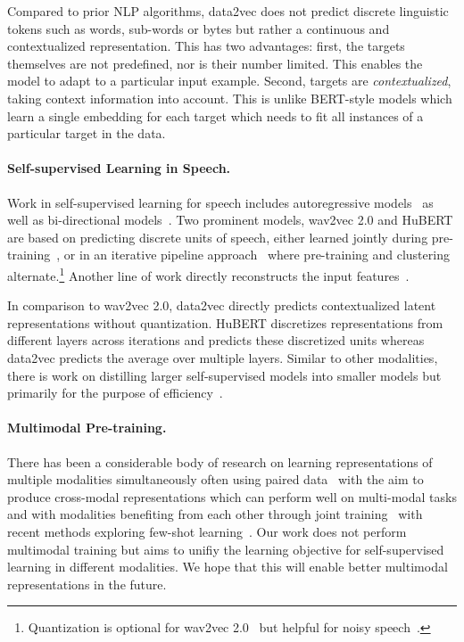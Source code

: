 \documentclass[nohyperref]{article}
\theoremstyle{plain}
\theoremstyle{definition}
\theoremstyle{remark}
\newcommand{\name}{data2vec}
\begin{document}
Compared to prior NLP algorithms, \name{} does not predict discrete linguistic tokens such as words, sub-words or bytes but rather a continuous and contextualized representation. 
This has two advantages: 
first, the targets themselves are not predefined, nor is their number limited.
This enables the model to adapt to a particular input example.
Second, targets are \emph{contextualized}, taking context information into account. 
This is unlike BERT-style models which learn a single embedding for each target which needs to fit all instances of a particular target in the data.


\paragraph{Self-supervised Learning in Speech.}
Work in self-supervised learning for speech includes autoregressive models~\citep{oord2018cpc,schneider2019wav2vec,baevski2019vqwav2vec,chung2019apc} as well as bi-directional models~\citep{baevski2020wav,hsu2020hubert,ao2021speecht5,chen2021wavlm}.
Two prominent models, wav2vec 2.0 and HuBERT are based on predicting discrete units of speech, either learned jointly during pre-training~\citep{baevski2020wav}, or in an iterative pipeline approach~\citep{hsu2020hubert} where pre-training and clustering alternate.\footnote{Quantization is optional for wav2vec 2.0~\citep{baevski2020wav,zhang2020pushing} but helpful for noisy speech~\citep{chung2021w2vbert}.
}
Another line of work directly reconstructs the input features~\citep{eloff2019unsupervised,liu2021tera}.

In comparison to wav2vec 2.0, \name{} directly predicts contextualized latent representations without quantization. 
HuBERT discretizes representations from different layers across iterations and predicts these discretized units whereas \name{} predicts the average over multiple layers.
Similar to other modalities, there is work on distilling larger self-supervised models into smaller models but primarily for the purpose of efficiency~\citep{chang2021distilhubert}.


\paragraph{Multimodal Pre-training.}
There has been a considerable body of research on learning representations of multiple modalities simultaneously often using paired data~\citep{aytar2017see,radford2021learning,wang2021vlmo,singh2021flava} with the aim to produce cross-modal representations which can perform well on multi-modal tasks and with modalities benefiting from each other through joint training~\citep{alayrac2020selfsupervised,akbari2021vatt} with recent methods exploring few-shot learning~\citep{tsimpoukelli2021multimodal}.
Our work does not perform multimodal training but aims to unifiy the learning objective for self-supervised learning in different modalities. 
We hope that this will enable better multimodal representations in the future.
\end{document}
